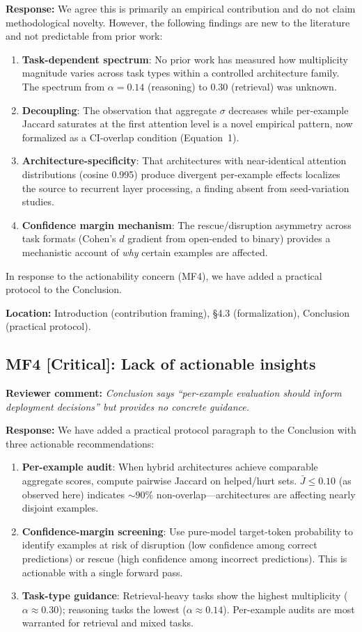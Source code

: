 \documentclass[11pt]{article}
\newcommand{\reviewer}[1]{\textcolor{reviewercolor}{\textbf{Reviewer comment:} \textit{#1}}}
\newcommand{\response}[1]{\textcolor{responsecolor}{\textbf{Response:} #1}}
\newcommand{\location}[1]{\textbf{Location:} #1}
\begin{document}
\response{We agree this is primarily an empirical contribution and do not claim methodological novelty. However, the following findings are new to the literature and not predictable from prior work:}
\begin{enumerate}[leftmargin=2em]
\item \textbf{Task-dependent spectrum}: No prior work has measured how multiplicity magnitude varies across task types within a controlled architecture family. The spectrum from $\alpha = 0.14$ (reasoning) to $0.30$ (retrieval) was unknown.
\item \textbf{Decoupling}: The observation that aggregate $\sigma$ decreases while per-example Jaccard saturates at the first attention level is a novel empirical pattern, now formalized as a CI-overlap condition (Equation~1).
\item \textbf{Architecture-specificity}: That architectures with near-identical attention distributions (cosine 0.995) produce divergent per-example effects localizes the source to recurrent layer processing, a finding absent from seed-variation studies.
\item \textbf{Confidence margin mechanism}: The rescue/disruption asymmetry across task formats (Cohen's $d$ gradient from open-ended to binary) provides a mechanistic account of \emph{why} certain examples are affected.
\end{enumerate}

In response to the actionability concern (MF4), we have added a practical protocol to the Conclusion.

\location{Introduction (contribution framing), \S4.3 (formalization), Conclusion (practical protocol).}

\subsection*{MF4 [Critical]: Lack of actionable insights}

\reviewer{Conclusion says ``per-example evaluation should inform deployment decisions'' but provides no concrete guidance.}

\response{We have added a practical protocol paragraph to the Conclusion with three actionable recommendations:}
\begin{enumerate}[leftmargin=2em]
\item \textbf{Per-example audit}: When hybrid architectures achieve comparable aggregate scores, compute pairwise Jaccard on helped/hurt sets. $\bar{J} \leq 0.10$ (as observed here) indicates ${\sim}90\%$ non-overlap---architectures are affecting nearly disjoint examples.
\item \textbf{Confidence-margin screening}: Use pure-model target-token probability to identify examples at risk of disruption (low confidence among correct predictions) or rescue (high confidence among incorrect predictions). This is actionable with a single forward pass.
\item \textbf{Task-type guidance}: Retrieval-heavy tasks show the highest multiplicity ($\alpha \approx 0.30$); reasoning tasks the lowest ($\alpha \approx 0.14$). Per-example audits are most warranted for retrieval and mixed tasks.
\end{enumerate}
\end{document}
